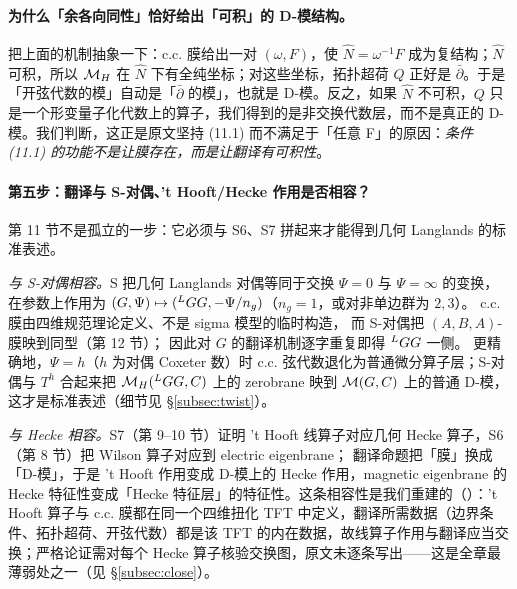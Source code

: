 
\paragraph{为什么「余各向同性」恰好给出「可积」的 D-模结构。}把上面的机制抽象一下：c.c. 膜给出一对 \((\omega,F)\)，使 \(\hat N=\omega^{-1}F\) 成为复结构；\(\hat N\) 可积，所以 \(\mathcal{M}_H\) 在 \(\hat N\) 下有全纯坐标；对这些坐标，拓扑超荷 \(Q\) 正好是 \(\bar\partial\)。于是「开弦代数的模」自动是「\(\bar\partial\) 的模」，也就是 D-模。反之，如果 \(\hat N\) 不可积，\(Q\) 只是一个形变量子化代数上的算子，我们得到的是非交换代数层，而不是真正的 D-模。我们判断，这正是原文坚持 (11.1) 而不满足于「任意 F」的原因：\emph{条件 (11.1) 的功能不是让膜存在，而是让翻译有可积性}。\pB{}\pC{}

\paragraph{第五步：翻译与 S-对偶、't Hooft/Hecke 作用是否相容？}第 11 节不是孤立的一步：它必须与 S6、S7 拼起来才能得到几何 Langlands 的标准表述。

\emph{与 S-对偶相容。}S 把几何 Langlands 对偶等同于交换 \(\Psi=0\) 与 \(\Psi=\infty\) 的变换，在参数上作用为 \((G,\Psi)\mapsto({}^{L}G G,-\Psi/n_g)\)（\(n_g=1\)，或对非单边群为 \(2,3\)）。\pA{} c.c. 膜由四维规范理论定义、不是 sigma 模型的临时构造，\pA{} 而 S-对偶把 \((A,B,A)\)-膜映到同型（第 12 节）；\pA{} 因此对 \(G\) 的翻译机制逐字重复即得 \({}^{L}G G\) 一侧。\pA{} 更精确地，\(\Psi=h\)（\(h\) 为对偶 Coxeter 数）时 c.c. 弦代数退化为普通微分算子层；S-对偶与 \(T^h\) 合起来把 \(\mathcal{M}_H({}^{L}G G,C)\) 上的 zerobrane 映到 \(\mathcal{M}(G,C)\) 上的普通 D-模，这才是标准表述（细节见 \S\ref{subsec:twist}）。\pA{}

\emph{与 Hecke 相容。}S7（第 9--10 节）证明 't Hooft 线算子对应几何 Hecke 算子，S6（第 8 节）把 Wilson 算子对应到 electric eigenbrane；\pA{} 翻译命题把「膜」换成「D-模」，于是 't Hooft 作用变成 D-模上的 Hecke 作用，magnetic eigenbrane 的 Hecke 特征性变成「Hecke 特征层」的特征性。这条相容性是我们重建的（\pB）：'t Hooft 算子与 c.c. 膜都在同一个四维扭化 TFT 中定义，翻译所需数据（边界条件、拓扑超荷、开弦代数）都是该 TFT 的内在数据，故线算子作用与翻译应当交换；严格论证需对每个 Hecke 算子核验交换图，原文未逐条写出——这是全章最薄弱处之一（见 \S\ref{subsec:close}）。\pB{}\pC{}

